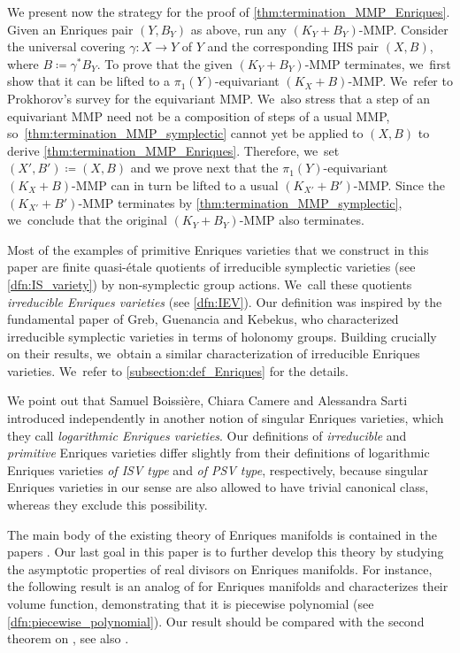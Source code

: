 \documentclass[JEP,XML,SOM,Unicode,published]{cedram}
\theoremstyle{plain}
\theoremstyle{definition}
\begin{document}
We present now the strategy for the proof of \autoref{thm:termination_MMP_Enriques}. Given an Enriques pair $(Y,B_Y)$ as above, run any $(K_Y+B_Y)$-MMP. Consider the universal covering $\gamma \colon X \to Y$ of $Y$ and the corresponding IHS pair $(X,B)$, where $B \coloneqq \gamma^* B_Y$. To prove that the given $(K_Y+B_Y)$-MMP terminates, we~first show that it can be lifted to a $\pi_1(Y)$-equivariant $(K_X+B)$-MMP. We~refer to Prokhorov's survey \cite{Pro21} for the equivariant MMP. We~also stress that a step of an equivariant MMP need not be a composition of steps of a usual MMP, so~\autoref{thm:termination_MMP_symplectic} cannot yet be applied to $(X,B)$ to derive \autoref{thm:termination_MMP_Enriques}.
Therefore, we~set $(X',B') \coloneqq (X, B)$ and we prove next that the $\pi_1(Y)$-equivariant $(K_X+B)$-MMP can in turn be lifted to a usual $(K_{X'} + B')$-MMP.
Since the $(K_{X'} + B')$-MMP terminates by \autoref{thm:termination_MMP_symplectic}, we~conclude that the original $(K_Y+B_Y)$-MMP also terminates.\enlargethispage{.5\baselineskip}

Most of the examples of primitive Enriques varieties that we construct in this paper are finite quasi-étale quotients of irreducible symplectic varieties (see \autoref{dfn:IS_variety}) by non-symplectic group actions. We~call these quotients \emph{irreducible Enriques varieties} (see \autoref{dfn:IEV}).
Our definition was inspired by the fundamental paper \cite{GGK19} of Greb, Guenancia and Kebekus, who characterized irreducible symplectic varieties in terms of holonomy groups. Building crucially on their results, we~obtain a similar characterization of irreducible Enriques varieties. We~refer to \autoref{subsection:def_Enriques} for the details.

We point out that Samuel Boissière, Chiara Camere and Alessandra Sarti introduced independently in \cite{BCS24} another notion of singular Enriques varieties, which they call \emph{logarithmic Enriques varieties}. Our definitions of \emph{irreducible} and \emph{primitive} Enriques varieties differ slightly from their definitions of logarithmic Enriques varieties \emph{of ISV type} and \emph{of PSV type}, respectively, because singular Enriques varieties in our sense are also allowed to have trivial canonical class, whereas they exclude this possibility.

The main body of the existing theory of Enriques manifolds is contained in the papers \cite{BNWS11,OS11a,OS11b}. Our last goal in this paper is to further develop this theory by studying the asymptotic properties of real divisors on Enriques manifolds.
For instance, the following result is an analog of \cite[Th.\,1.6(2)]{Denisi23} for Enriques manifolds and characterizes their volume function, demonstrating that it is piecewise polynomial (see \autoref{dfn:piecewise_polynomial}). Our result should be compared with the second theorem on \cite[p.\,210]{BKS04}, see also \cite[\S 3.3]{BKS04}.
\end{document}
